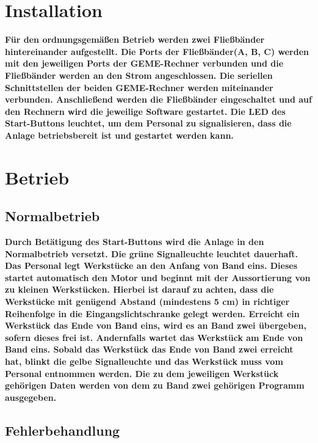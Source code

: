 \documentclass[oneside,a4paper,titlepage]{scrartcl} %
\begin{document}
\section{Installation}
\textbf{Für den ordnungsgemäßen Betrieb werden zwei Fließbänder hintereinander aufgestellt.\newline
Die Ports der Fließbänder(A, B, C) werden mit den jeweiligen  Ports der GEME-Rechner verbunden und die Fließbänder werden an den Strom angeschlossen. \newline
Die seriellen Schnittstellen der beiden GEME-Rechner werden miteinander verbunden. \newline
Anschließend werden die Fließbänder eingeschaltet und auf den Rechnern wird die jeweilige Software gestartet.\newline
Die LED des Start-Buttons leuchtet, um dem Personal zu signalisieren, dass die Anlage betriebsbereit ist und gestartet werden kann.}
\newpage

\section{Betrieb}
\subsection{Normalbetrieb}
\textbf{Durch Betätigung des Start-Buttons wird die Anlage in den Normalbetrieb versetzt.\newline
Die grüne Signalleuchte leuchtet dauerhaft.\newline
Das Personal legt Werkstücke an den Anfang von Band eins. Dieses startet automatisch den Motor und beginnt mit der Aussortierung von zu kleinen Werkstücken. Hierbei ist darauf zu achten, dass die Werkstücke mit genügend Abstand (mindestens 5 cm) in richtiger Reihenfolge in die Eingangslichtschranke gelegt werden. \newline
Erreicht ein Werkstück das Ende von Band eins, wird es an Band zwei übergeben, sofern dieses frei ist. Andernfalls wartet das Werkstück am Ende von Band eins. \newline
Sobald das Werkstück das Ende von Band zwei erreicht hat, blinkt die gelbe Signalleuchte und das Werkstück muss vom Personal entnommen werden.\newline
Die zu dem jeweiligen Werkstück gehörigen Daten werden von dem zu Band zwei gehörigen Programm ausgegeben.}

\subsection{Fehlerbehandlung}
\end{document}
